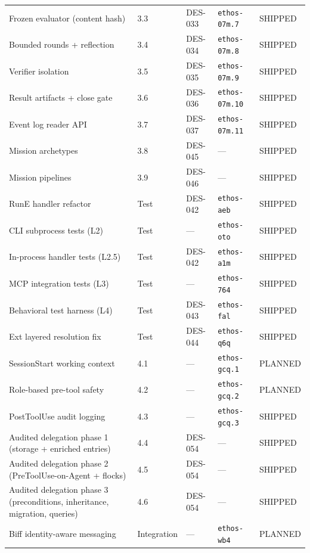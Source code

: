 \documentclass[a4paper,10pt]{article}
\begin{document}
\begin{center}
\begin{longtable}{@{}lllll@{}}
Frozen evaluator (content hash)& 3.3 & DES-033      & \texttt{ethos-07m.7} & SHIPPED \\
Bounded rounds + reflection    & 3.4 & DES-034      & \texttt{ethos-07m.8} & SHIPPED \\
Verifier isolation             & 3.5 & DES-035      & \texttt{ethos-07m.9} & SHIPPED \\
Result artifacts + close gate  & 3.6 & DES-036      & \texttt{ethos-07m.10} & SHIPPED \\
Event log reader API           & 3.7 & DES-037      & \texttt{ethos-07m.11} & SHIPPED \\
Mission archetypes             & 3.8 & DES-045      & ---                  & SHIPPED \\
Mission pipelines              & 3.9 & DES-046      & ---                  & SHIPPED \\
\midrule
RunE handler refactor          & Test & DES-042      & \texttt{ethos-aeb}   & SHIPPED \\
CLI subprocess tests (L2)      & Test & ---          & \texttt{ethos-oto}   & SHIPPED \\
In-process handler tests (L2.5)& Test & DES-042      & \texttt{ethos-a1m}   & SHIPPED \\
MCP integration tests (L3)     & Test & ---          & \texttt{ethos-764}   & SHIPPED \\
Behavioral test harness (L4)   & Test & DES-043      & \texttt{ethos-fal}   & SHIPPED \\
Ext layered resolution fix     & Test & DES-044      & \texttt{ethos-q6q}   & SHIPPED \\
\midrule
SessionStart working context   & 4.1 & ---          & \texttt{ethos-gcq.1} & PLANNED \\
Role-based pre-tool safety     & 4.2 & ---          & \texttt{ethos-gcq.2} & PLANNED \\
PostToolUse audit logging      & 4.3 & ---          & \texttt{ethos-gcq.3} & SHIPPED \\
\midrule
Audited delegation phase 1
  (storage + enriched entries) & 4.4 & DES-054      & ---            & SHIPPED \\
Audited delegation phase 2
  (PreToolUse-on-Agent + flocks) & 4.5 & DES-054     & ---            & SHIPPED \\
Audited delegation phase 3
  (preconditions, inheritance,
   migration, queries)         & 4.6 & DES-054      & ---            & SHIPPED \\
\midrule
Biff identity-aware messaging  & Integration & ---  & \texttt{ethos-wb4} & PLANNED \\

\end{longtable}
\end{center}
\end{document}

